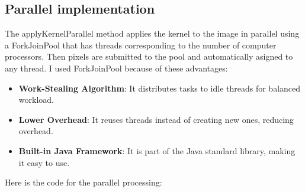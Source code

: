 \documentclass{article}
\begin{document}
\begin{multicols}{2}
    \subsection{Parallel implementation}

    The applyKernelParallel method applies the kernel to the image in parallel using a ForkJoinPool that has threads corresponding to the number of computer processors. Then pixels are submitted to the pool and automatically asigned to any thread. I used ForkJoinPool because of these advantages:

    \begin{itemize}
        \item \textbf{Work-Stealing Algorithm}: It  distributes tasks to idle threads for balanced workload.
        \item \textbf{Lower Overhead}: It reuses threads instead of creating new ones, reducing overhead.
        \item \textbf{Built-in Java Framework}: It is part of the Java standard library, making it easy to use.
    \end{itemize}

    \newblock

    Here is the code for the parallel processing:


\end{multicols}
\end{document}
